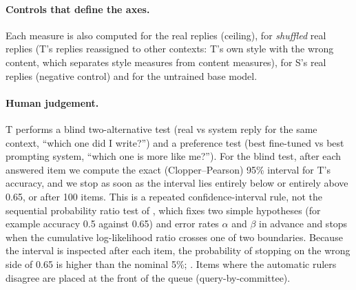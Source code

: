 \paragraph{Controls that define the axes.}
Each measure is also computed for the real replies (ceiling), for \emph{shuffled} real replies (T's replies reassigned to other contexts: T's own style with the wrong content, which separates style measures from content measures), for S's real replies (negative control) and for the untrained base model.

\paragraph{Human judgement.}
T performs a blind two-alternative test (real vs system reply for the same context, ``which one did I write?'') and a preference test (best fine-tuned vs best prompting system, ``which one is more like me?'').
For the blind test, after each answered item we compute the exact (Clopper--Pearson) 95\% interval for T's accuracy, and we stop as soon as the interval lies entirely below or entirely above 0.65, or after 100 items.
This is a repeated confidence-interval rule, not the sequential probability ratio test of \citet{wald1945sequential}, which fixes two simple hypotheses (for example accuracy 0.5 against 0.65) and error rates $\alpha$ and $\beta$ in advance and stops when the cumulative log-likelihood ratio crosses one of two boundaries.
Because the interval is inspected after each item, the probability of stopping on the wrong side of 0.65 is higher than the nominal 5\%; .
Items where the automatic rulers disagree are placed at the front of the queue (query-by-committee).


